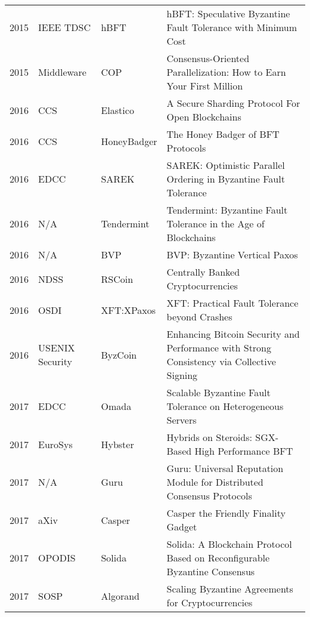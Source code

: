 \documentclass{article}
\begin{document}
\begin{landscape}
\begin{longtable}[c]{llll}
2015 & IEEE TDSC         & hBFT           & hBFT: Speculative Byzantine Fault Tolerance with Minimum Cost  \cite{6775264}                            \\
2015 & Middleware        & COP            & Consensus-Oriented Parallelization: How to Earn Your First Million   \cite{Behl:2015:CPE:2814576.2814800}                      \\
2016 & CCS               & Elastico       & A Secure Sharding Protocol For Open Blockchains \cite{Luu:2016:SSP:2976749.2978389}                                          \\
2016 & CCS               & HoneyBadger    & The Honey Badger of BFT Protocols   \cite{Miller:2016:HBB:2976749.2978399}                                                       \\
2016 & EDCC              & SAREK          & SAREK: Optimistic Parallel Ordering in Byzantine Fault Tolerance \cite{7780347}                         \\

2016 & N/A               & Tendermint     & Tendermint: Byzantine Fault Tolerance in the Age of Blockchains      \cite{Buchman2016TendermintBF}                     \\
2016 & N/A               & BVP            & BVP: Byzantine Vertical Paxos                                                             \\
2016 & NDSS              & RSCoin         & Centrally Banked Cryptocurrencies   \cite{DBLP:journals/corr/DanezisM15}                                                      \\
2016 & OSDI              & XFT:XPaxos     & XFT: Practical Fault Tolerance beyond Crashes     \cite{Liu:2016:XPF:3026877.3026915}                                         \\
2016 & USENIX Security   & ByzCoin        & Enhancing Bitcoin Security and Performance with Strong Consistency via Collective Signing \\
2017 & EDCC              & Omada          & Scalable Byzantine Fault Tolerance on Heterogeneous Servers     \cite{8123550}                          \\
2017 & EuroSys           & Hybster        & Hybrids on Steroids: SGX-Based High Performance BFT              \cite{Behl:2017:HSS:3064176.3064213}                        \\
2017 & N/A               & Guru           & Guru: Universal Reputation Module for Distributed Consensus Protocols                     \\
2017 & aXiv              & Casper     &Casper the Friendly Finality Gadget   \cite{DBLP:journals/corr/abs-1710-09437}                         \\
2017 & OPODIS            & Solida         & Solida: A Blockchain Protocol Based on Reconfigurable Byzantine Consensus   \cite{cryptoeprint:2017:1118}              \\
2017 & SOSP              & Algorand       & Scaling Byzantine Agreements for Cryptocurrencies \cite{Gilad:2017:ASB:3132747.3132757}                                        \\


\end{longtable}
\end{landscape}
\end{document}
